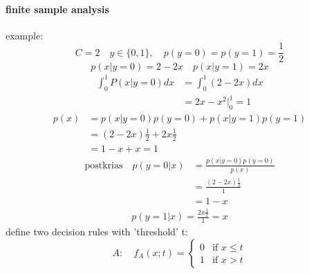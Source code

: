 \documentclass[11pt]{article}
\begin{document}
        \paragraph{finite sample analysis}
          example:
          \begin{equation*}
            C=2 \quad y \in \{0, 1\}, \quad p(y=0) = p(y=1) = \frac{1}{2}
          \end{equation*}
          \begin{equation*}
            p(x|y=0) = 2 - 2x \quad p(x|y=1) = 2x
          \end{equation*}
          \begin{equation*}
            \begin{align*}
              \int_{0}^{1} P(x|y=0)dx &= \int_{0}^{1} (2-2x)dx \\
              &= 2x - x^2  \Big | _{0}^{1} = 1
            \end{align*}
          \end{equation*}
          \begin{equation*}
            \begin{align*}
              p(x) &= p(x|y=0)p(y=0) + p(x|y=1)p(y=1) \\
                   &= (2-2x)\frac{1}{2} + 2x \frac{1}{2} \\
                   &= 1 - x + x = 1
            \end{align*}
          \end{equation*}
          \begin{equation*}
            \begin{align*}
              \text{postkrias} \quad p(y=0|x) &= \frac{p(x|y=0)p(y=0)}{p(x)} \\
              &= \frac{(2 - 2x)\frac{1}{2}}{1} \\
              &= 1 - x
            \end{align*}
          \end{equation*}
          \begin{equation*}
            \begin{align*}
              p(y=1|x) = \frac{2x\frac{1}{2}}{1} = x
            \end{align*}
          \end{equation*}
          define two decision rules with 'threshold' t:
          \begin{equation*}
            A: \quad f_{A}(x;t) = \begin{cases}
            0 & \text{if $x\leq t$} \\
            1 & \text{if $x > t$}
            \end{cases}
          \end{equation*}
\end{document}
